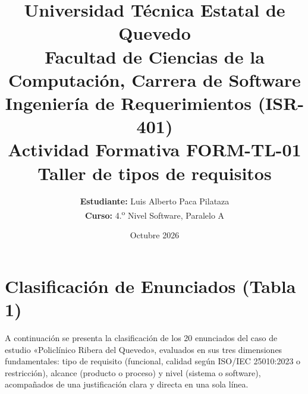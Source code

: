 \documentclass[11pt,a4paper]{article}
\title{\textbf{Universidad Técnica Estatal de Quevedo}\\[0.3em]
\large Facultad de Ciencias de la Computación, Carrera de Software\\[0.5em]
\Large Ingeniería de Requerimientos (ISR-401)\\[0.8em]
\LARGE \textbf{Actividad Formativa FORM-TL-01}\\
\Large Taller de tipos de requisitos}
\author{\textbf{Estudiante:} Luis Alberto Paca Pilataza \\
\textbf{Curso:} 4.\textsuperscript{o} Nivel Software, Paralelo A}
\date{Octubre 2026}
\begin{document}
\maketitle

\section{Clasificación de Enunciados (Tabla 1)}

A continuación se presenta la clasificación de los 20 enunciados del caso de estudio «Policlínico Ribera del Quevedo», evaluados en sus tres dimensiones fundamentales: tipo de requisito (funcional, calidad según ISO/IEC 25010:2023 o restricción), alcance (producto o proceso) y nivel (sistema o software), acompañados de una justificación clara y directa en una sola línea.
\end{document}
